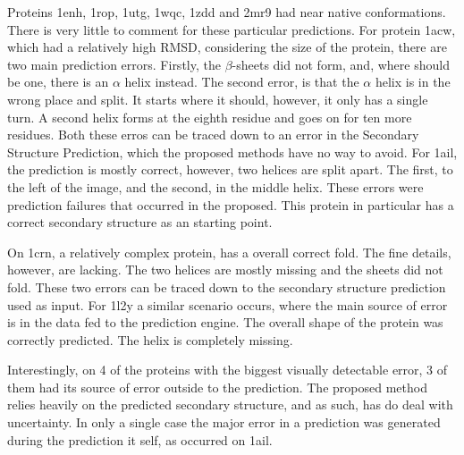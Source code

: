 Proteins 1enh, 1rop, 1utg, 1wqc, 1zdd and 2mr9 had near native conformations.
There is very little to comment for these particular predictions. For protein 1acw,
which had a relatively high RMSD, considering the size of the protein, there are
two main prediction errors. Firstly, the $\beta$-sheets did not form, and, where
should be one, there is an $\alpha$ helix instead. The second error, is that the
$\alpha$ helix is in the wrong place and split. It starts where it should,
however, it only has a single turn. A second helix forms at the eighth residue
and goes on for ten more residues. Both these erros can be traced down to an
error in the Secondary Structure Prediction, which the proposed methods have no
way to avoid. For 1ail, the prediction is mostly correct, however, two helices
are split apart. The first, to the left of the image, and the second, in the
middle helix. These errors were prediction failures that occurred in the proposed.
This protein in particular has a correct secondary structure as an starting
point.

On 1crn, a relatively complex protein, has a overall correct fold. The fine
details, however, are lacking. The two helices are mostly missing and the
sheets did not fold. These two errors can be traced down to the secondary
structure prediction used as input. For 1l2y a similar scenario occurs, where
the main source of error is in the data fed to the prediction engine. The
overall shape of the protein was correctly predicted. The helix is completely
missing.

Interestingly, on 4 of the proteins with the biggest visually detectable error,
3 of them had its source of error outside to the prediction. The proposed method
relies heavily on the predicted secondary structure, and as such, has do deal
with uncertainty. In only a single case the major error in a prediction was
generated during the prediction it self, as occurred on 1ail.

